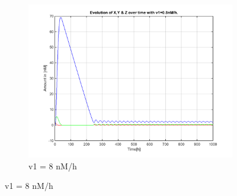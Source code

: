 \documentclass[10pt,a4paper,oneside,twocolumn]{article}
\numberwithin{equation}{section} %
\begin{document}
\begin{figure}
\begin{subfigure}[b]{0.3\textwidth}
	    \includegraphics[width=\textwidth]{LotsofthesameA/A-A8.png}
	    \caption{v1 = 8 nM/h}
	\end{subfigure}
	 

\end{figure}
\end{document}
